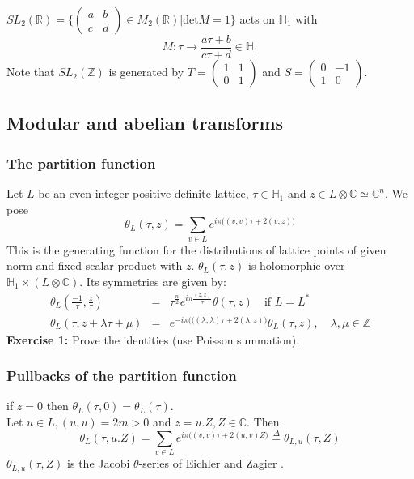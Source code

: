 \documentclass[10pt,a4paper]{article}
\begin{document}
$SL_2(\mathbb{R})=\{\left(\begin{array}{cc}a&b\\c&d\end{array}\right)\in M_2(\mathbb{R})|\textrm{det}M=1\}$ acts on $\mathbb{H}_1$ with
\[M:\tau\rightarrow\frac{a\tau+b}{c\tau+d}\in\mathbb{H}_1\]
Note that $SL_2(\mathbb{Z})$ is generated by $T=\left(\begin{array}{cc}1&1\\0&1\end{array}\right)$ and $S=\left(\begin{array}{cc}0&-1\\1&0\end{array}\right)$.
\subsection{Modular and abelian transforms}
\subsubsection{The partition function}
Let $L$ be an even integer positive definite lattice, $\tau\in\mathbb{H}_1$ and $z\in L\otimes\mathbb{C}\simeq\mathbb{C}^n$. We pose
\[\theta_L(\tau,z)=\sum_{v\in L}e^{i\pi\big((v,v)\tau+2(v,z)\big)}\]
This is the generating function for the distributions of lattice points of given norm and fixed scalar product with $z$. $\theta_L(\tau,z)$ is holomorphic over $\mathbb{H}_1\times(L\otimes\mathbb{C})$. Its symmetries are given by:
\begin{eqnarray}
\theta_L\left(\frac{-1}{\tau},\frac{z}{\tau}\right)&=&\tau^{\frac{n}{2}}e^{i\pi\frac{(z,z)}{\tau}}\theta(\tau,z)\quad\textrm{if }L=L^*\\
\theta_L(\tau,z+\lambda\tau+\mu)&=&e^{-i\pi\big(((\lambda,\lambda)\tau+2(\lambda,z)\big)}\theta_L(\tau,z),\quad\lambda,\mu\in\mathbb{Z}
\end{eqnarray}
\textbf{Exercise 1:} Prove the identities (use Poisson summation).\\

\subsubsection{Pullbacks of the partition function}
if $z=0$ then $\theta_L(\tau,0)=\theta_L(\tau)$.\\
Let $u\in L,(u,u)=2m>0$ and $z=u.Z,Z\in\mathbb{C}$. Then
\[\theta_L(\tau, u.Z)=\sum_{v\in L}e^{i\pi\big((v,v)\tau+2(u,v)Z\big)}\overset{\Delta}{=}\theta_{L,u}(\tau,Z)\]
$\theta_{L,u}(\tau,Z)$ is the Jacobi $\theta$-series of Eichler and Zagier \cite{EZ}.\\
\end{document}

